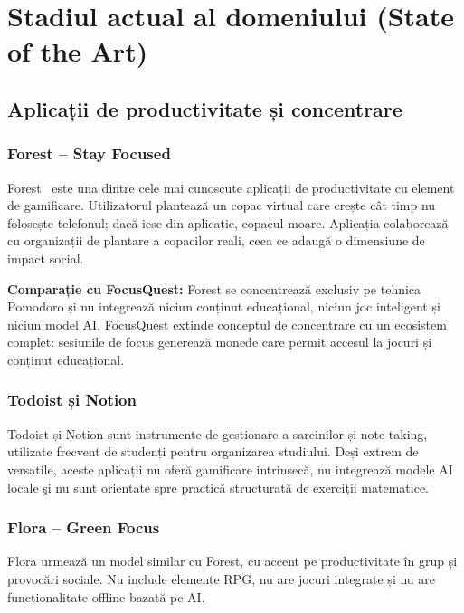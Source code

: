 \documentclass[12pt, a4paper, twoside]{report}
\numberwithin{equation}{section}
\begin{document}
\chapter{Stadiul actual al domeniului (State of the Art)}

\section{Aplicații de productivitate și concentrare}

\subsection{Forest – Stay Focused}

Forest~\cite{forest} este una dintre cele mai cunoscute aplicații de productivitate cu element de
gamificare. Utilizatorul plantează un copac virtual care crește cât timp nu folosește
telefonul; dacă iese din aplicație, copacul moare. Aplicația colaborează cu organizații
de plantare a copacilor reali, ceea ce adaugă o dimensiune de impact social.

\textbf{Comparație cu FocusQuest:} Forest se concentrează exclusiv pe tehnica Pomodoro
și nu integrează niciun conținut educațional, niciun joc inteligent și niciun model AI.
FocusQuest extinde conceptul de concentrare cu un ecosistem complet: sesiunile de focus
generează monede care permit accesul la jocuri și conținut educațional.

\subsection{Todoist și Notion}

Todoist și Notion sunt instrumente de gestionare a sarcinilor și note-taking, utilizate
frecvent de studenți pentru organizarea studiului. Deși extrem de versatile, aceste aplicații
nu oferă gamificare intrinsecă, nu integrează modele AI locale şi nu sunt orientate spre
practică structurată de exerciții matematice.

\subsection{Flora – Green Focus}

Flora urmează un model similar cu Forest, cu accent pe productivitate în grup și provocări
sociale. Nu include elemente RPG, nu are jocuri integrate și nu are funcționalitate offline
bazată pe AI.
\end{document}
